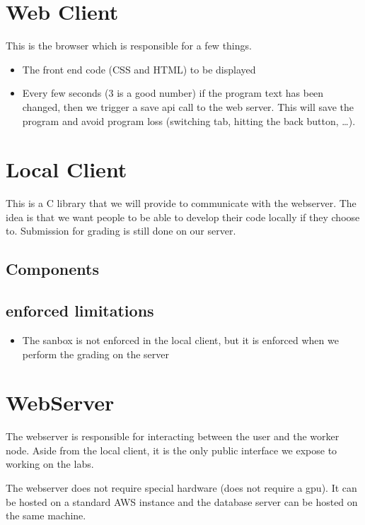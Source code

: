 \section{Web Client}

This is the browser which is responsible for a few things.

\begin{itemize}
\item
  The front end code (CSS and HTML) to be displayed
\item
  Every few seconds (3 is a good number) if the program text has been
  changed, then we trigger a save api call to the web server. This will
  save the program and avoid program loss (switching tab, hitting the
  back button, \ldots{}).
\end{itemize}

\section{Local Client}

This is a C library that we will provide to communicate with the
webserver. The idea is that we want people to be able to develop their
code locally if they choose to. Submission for grading is still done on
our server.

\subsection{Components}

\subsection{enforced limitations}

\begin{itemize}
\item
  The sanbox is not enforced in the local client, but it is enforced
  when we perform the grading on the server
\end{itemize}

\section{WebServer}

The webserver is responsible for interacting between the user and the
worker node. Aside from the local client, it is the only public
interface we expose to working on the labs.

The webserver does not require special hardware (does not require a
gpu). It can be hosted on a standard AWS instance and the database
server can be hosted on the same machine.

